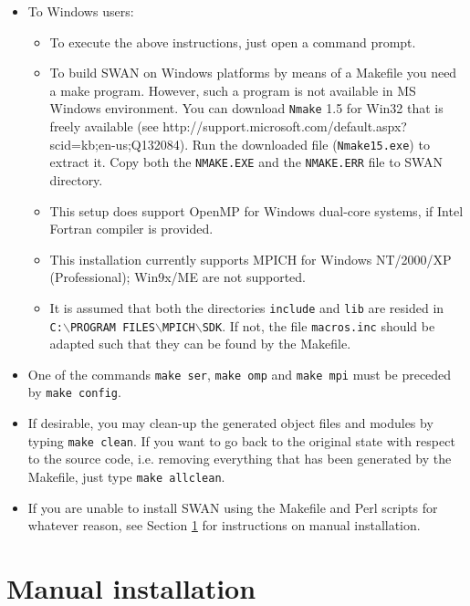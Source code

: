\documentclass[12pt]{book}
\begin{document}
\begin{itemize}
  \item To Windows users:
        \begin{itemize}
           \item To execute the above instructions, just open a command prompt.
           \item To build SWAN on Windows platforms by means of a Makefile you need a make program.
                 However, such a program is not available in MS Windows environment. You can download
                 {\tt Nmake} 1.5 for Win32 that is freely available
                 (see http://support.microsoft.com/default.aspx?scid=kb;en-us;Q132084). Run the
                 downloaded file ({\tt Nmake15.exe}) to extract it. Copy both the {\tt NMAKE.EXE} and
                 the {\tt NMAKE.ERR} file to SWAN directory.
           \item This setup does support OpenMP for Windows dual-core systems, if Intel Fortran
                 compiler is provided.
           \item This installation currently supports MPICH for
                 Windows NT/2000/XP (Professional); Win9x/ME are not supported.
           \item It is assumed that both the directories {\tt include} and
                 {\tt lib} are resided in\\
                 {\tt C:$\backslash$PROGRAM FILES$\backslash$MPICH$\backslash$SDK}.
                 If not, the file {\tt macros.inc} should be adapted such
                 that they can be found by the Makefile.
        \end{itemize}
  \item One of the commands {\tt make ser}, {\tt make omp} and {\tt make mpi}
        must be preceded by {\tt make config}.
  \item If desirable, you may clean-up the generated object files and modules by
        typing {\tt make~clean}. If you want to go back to the original state
        with respect to the source code, i.e. removing everything that has been
        generated by the Makefile, just type {\tt make~allclean}.
  \item If you are unable to install SWAN using the Makefile and Perl scripts for
        whatever reason, see Section \ref{sec:manual} for instructions on manual
        installation.
\end{itemize}

\section{Manual installation} \label{sec:manual}
\end{document}
